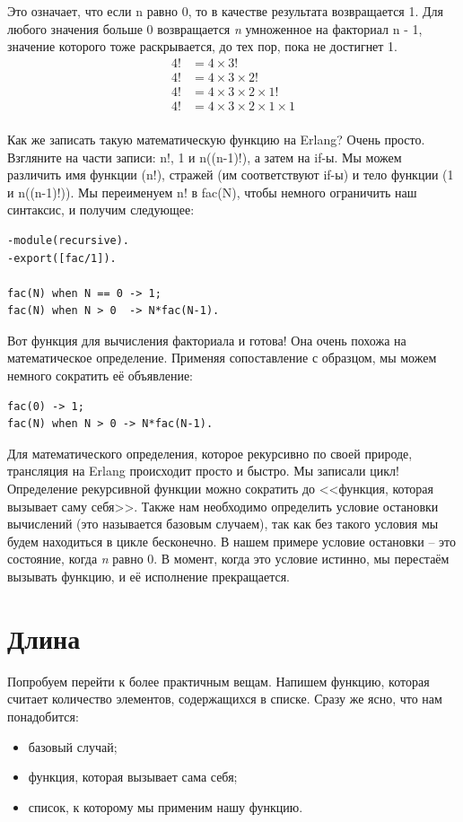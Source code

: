 \documentclass[a4paper,12pt]{report}
\newcommand{\ops}{\colorbox{lgreen}}
\begin{document}
Это означает, что если n равно 0, то в качестве результата возвращается 1. Для любого значения больше 0 возвращается \emph{n} умноженное на факториал \ops{n - 1}, значение которого тоже раскрывается, до тех пор, пока не достигнет 1.
\begin{align*}
4! &= 4 \times 3! \\
4! &= 4 \times 3 \times 2! \\
4! &= 4 \times 3 \times 2 \times 1! \\
4! &= 4 \times 3 \times 2 \times 1 \times 1 \\
\end{align*}

Как же записать такую математическую функцию на Erlang? Очень просто. Взгляните на части записи: \ops{n!}, 1 и \ops{n((n-1)!)}, а затем на \ops{if}\--ы. Мы можем различить имя функции (\ops{n!}), стражей (им соответствуют \ops{if}\--ы) и тело функции (1 и \ops{n((n-1)!)}). Мы переименуем \ops{n!} в \ops{fac(N)}, чтобы немного ограничить наш синтаксис, и получим следующее:
\begin{lstlisting}[style=erlang]
-module(recursive).
-export([fac/1]).
 
fac(N) when N == 0 -> 1;
fac(N) when N > 0  -> N*fac(N-1).
\end{lstlisting}

Вот функция для вычисления факториала и готова! Она очень похожа на математическое определение. Применяя сопоставление с образцом, мы можем немного сократить её объявление:
\begin{lstlisting}[style=erlang]
fac(0) -> 1;
fac(N) when N > 0 -> N*fac(N-1).
\end{lstlisting}

Для математического определения, которое рекурсивно по своей природе, трансляция на Erlang происходит просто и быстро. Мы записали цикл! Определение рекурсивной функции можно сократить до <<функция, которая вызывает саму себя>>. Также нам необходимо определить условие остановки вычислений (это называется базовым случаем), так как без такого условия мы будем находиться в цикле бесконечно. В нашем примере условие остановки \--- это состояние, когда \emph{n} равно 0. В момент, когда это условие истинно, мы перестаём вызывать функцию, и её исполнение прекращается. 
\section{Длина}
\label{length}
Попробуем перейти к более практичным вещам. Напишем функцию, которая считает количество элементов, содержащихся в списке. Сразу же ясно, что нам понадобится:\\
\begin{itemize}
\item базовый случай;
\item функция, которая вызывает сама себя;
\item список, к которому мы применим нашу функцию.
\end{itemize}
\end{document}
